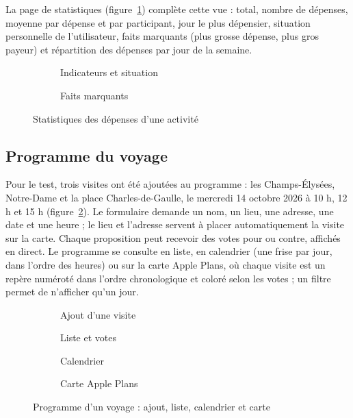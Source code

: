 La page de statistiques (figure~\ref{fig:ecran_stats}) complète cette vue : total, nombre de
dépenses, moyenne par dépense et par participant, jour le plus dépensier, situation
personnelle de l'utilisateur, faits marquants (plus grosse dépense, plus gros payeur) et
répartition des dépenses par jour de la semaine.

\begin{figure}[H]
\centering
\begin{subfigure}[t]{0.31\textwidth}\centering{}\caption{Indicateurs et situation}\end{subfigure}\hspace{0.05\textwidth}
\begin{subfigure}[t]{0.31\textwidth}\centering{}\caption{Faits marquants}\end{subfigure}
\caption{Statistiques des dépenses d'une activité}
\label{fig:ecran_stats}
\end{figure}

\subsection{Programme du voyage}

Pour le test, trois visites ont été ajoutées au programme : les Champs-Élysées, Notre-Dame
et la place Charles-de-Gaulle, le mercredi 14 octobre 2026 à 10 h, 12 h et 15 h
(figure~\ref{fig:ecran_programme}). Le formulaire demande un nom, un lieu, une adresse, une
date et une heure ; le lieu et l'adresse servent à placer automatiquement la visite sur la
carte. Chaque proposition peut recevoir des votes pour ou contre, affichés en direct. Le
programme se consulte en liste, en calendrier (une frise par jour, dans l'ordre des heures)
ou sur la carte Apple Plans, où chaque visite est un repère numéroté dans l'ordre
chronologique et coloré selon les votes ; un filtre permet de n'afficher qu'un jour.

\begin{figure}[H]
\centering
\begin{subfigure}[t]{0.235\textwidth}\centering{}\caption{Ajout d'une visite}\end{subfigure}\hfill
\begin{subfigure}[t]{0.235\textwidth}\centering{}\caption{Liste et votes}\end{subfigure}\hfill
\begin{subfigure}[t]{0.235\textwidth}\centering{}\caption{Calendrier}\end{subfigure}\hfill
\begin{subfigure}[t]{0.235\textwidth}\centering{}\caption{Carte Apple Plans}\end{subfigure}
\caption{Programme d'un voyage : ajout, liste, calendrier et carte}
\label{fig:ecran_programme}
\end{figure}

